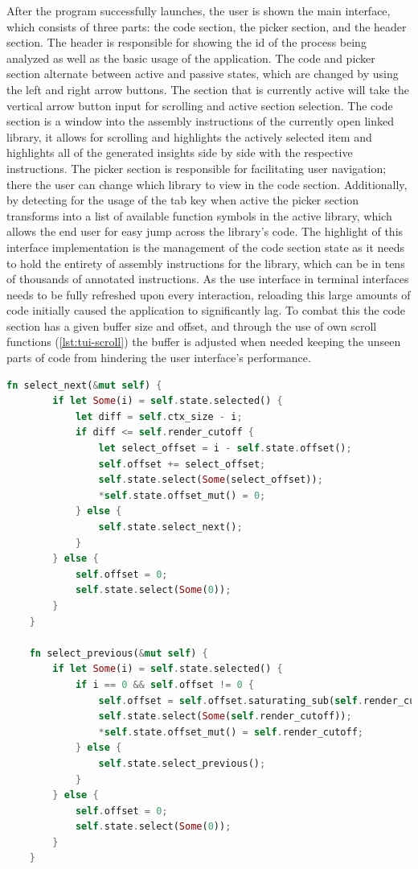 After the program successfully launches, the user is shown the main interface, which consists of three parts: the code section, the picker section, and the header section.
The header is responsible for showing the id of the process being analyzed as well as the basic usage of the application.
The code and picker section alternate between active and passive states, which are changed by using the left and right arrow buttons.
The section that is currently active will take the vertical arrow button input for scrolling and active section selection. 
The code section is a window into the assembly instructions of the currently open linked library, it allows for scrolling and highlights the actively selected item and highlights all of the generated insights side by side with the respective instructions.
The picker section is responsible for facilitating user navigation; there the user can change which library to view in the code section.
Additionally, by detecting for the usage of the tab key when active the picker section transforms into a list of available function symbols in the active library, which allows the end user for easy jump across the library's code.
The highlight of this interface implementation is the management of the code section state as it needs to hold the entirety of assembly instructions for the library, which can be in tens of thousands of annotated instructions.
As the use interface in terminal interfaces needs to be fully refreshed upon every interaction, reloading this large amounts of code initially caused the application to significantly lag.
To combat this the code section has a given buffer size and offset, and through the use of own scroll functions (\autoref{lst:tui-scroll}) the buffer is adjusted when needed keeping the unseen parts of code from hindering the user interface's performance.

\begin{lstlisting}[caption=\label{lst:tui-scroll}"Custom overlays over the basic scroll functions", language=Rust]
    fn select_next(&mut self) {
        if let Some(i) = self.state.selected() {
            let diff = self.ctx_size - i;
            if diff <= self.render_cutoff {
                let select_offset = i - self.state.offset();
                self.offset += select_offset;
                self.state.select(Some(select_offset));
                *self.state.offset_mut() = 0;
            } else {
                self.state.select_next();
            }
        } else {
            self.offset = 0;
            self.state.select(Some(0));
        }
    }

    fn select_previous(&mut self) {
        if let Some(i) = self.state.selected() {
            if i == 0 && self.offset != 0 {
                self.offset = self.offset.saturating_sub(self.render_cutoff);
                self.state.select(Some(self.render_cutoff));
                *self.state.offset_mut() = self.render_cutoff;
            } else {
                self.state.select_previous();
            }
        } else {
            self.offset = 0;
            self.state.select(Some(0));
        }
    }
\end{lstlisting}

